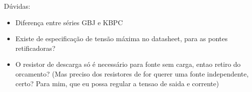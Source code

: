 \documentclass[a4paper,12pt,oneside,openany,table,xcdraw]{article}
\begin{document}
Dúvidas:%
\begin{itemize}
\item Diferença entre séries GBJ e KBPC
\item Existe de especificação de tensão máxima no datasheet, para as pontes retificadoras?
\item O resistor de descarga só é necessário para fonte sem carga, entao retiro do orcamento? (Mas preciso dos resistores de for querer uma fonte independente, certo? Para mim, que eu possa regular a tensao de saida e corrente) 
\end{itemize}

\begin{table}[H]
\def\arraystretch{1.28}
\centering
\caption{Componentes e orçamento da fonte.}
\label{fonte:componentes}
\end{table}
\end{document}
